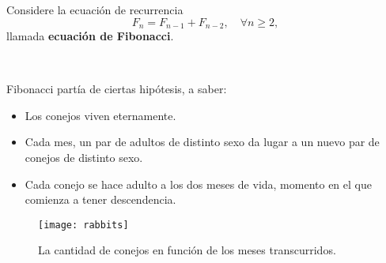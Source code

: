 \begin{frame}
\frametitle{\subsubsecname}

Considere la ecuación de recurrencia \[ F_{n}=F_{n-1}+F_{n-2},\quad\forall n\geq2, \] llamada \textbf{ecuación de Fibonacci}.

\

\begin{minipage}{0.45\paperwidth}
Fibonacci partía de ciertas hipótesis, a saber:
	\begin{itemize}
		\item Los conejos viven eternamente.
		\item Cada mes, un par de adultos de distinto sexo da lugar a un nuevo par de conejos de distinto sexo.
		\item Cada conejo se hace adulto a los dos meses de vida, momento en el que comienza a tener descendencia.
	\end{itemize}
\end{minipage}
\hfill
\begin{minipage}{0.45\paperwidth}
	\begin{figure}[H]
		\centering
		\texttt{[image: rabbits]}
		\caption{La cantidad de conejos en función de los meses transcurridos.}
	\end{figure}
\end{minipage}

\end{frame}